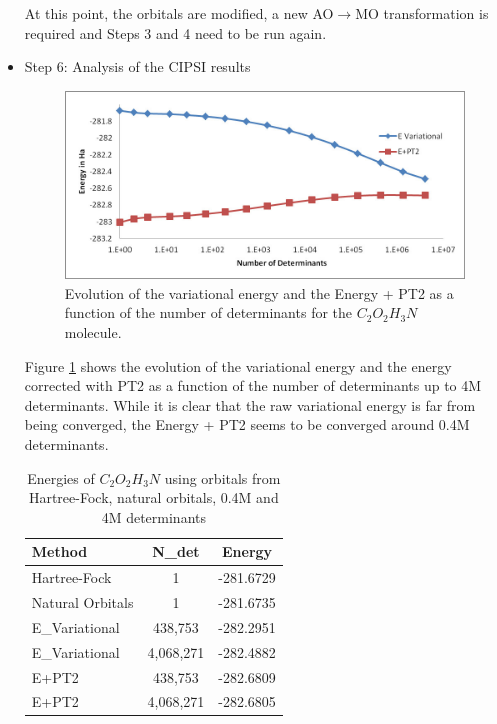 \begin{itemize}
At this point, the orbitals are modified, a new AO$\rightarrow$MO transformation is required and Steps 3 and 4 need to be run again.\\

\item Step 6: Analysis of the CIPSI results\\
\begin{figure}
\begin{center}
\includegraphics[trim = 2mm 2mm 2mm 2mm, clip,width=0.95\columnwidth]{figures/CIPSI.jpg}
\end{center}
\caption{Evolution of the variational energy and the Energy + PT2 as a function of the number of determinants for the $C_2O_2H_3N$ molecule. 
\label{fig:CIPSI}
}
\end{figure}
Figure \ref{fig:CIPSI} shows the evolution of the variational energy and the energy corrected with PT2 as a function of the number of determinants up to 4M determinants. While it is clear that the raw variational energy is far from being converged, the Energy + PT2  seems to be converged around 0.4M determinants.\\



\begin{table}[t]
\centering
\caption{Energies of $C_2O_2H_3N$ using orbitals from Hartree-Fock, natural orbitals, 0.4M and 4M determinants}
\label{TAB:CIPSI}
\begin{tabular}{l|c|c}
\hline \hline
Method & N\_det & Energy\\
\hline
Hartree-Fock &    1    & -281.6729\\
Natural Orbitals & 1 & -281.6735\\
E\_Variational &  438,753 & -282.2951 \\
E\_Variational &  4,068,271   & -282.4882 \\
E+PT2 & 438,753& -282.6809 \\
E+PT2 & 4,068,271 & -282.6805  \\ \hline \hline
\end{tabular}
\end{table}



\end{itemize}
